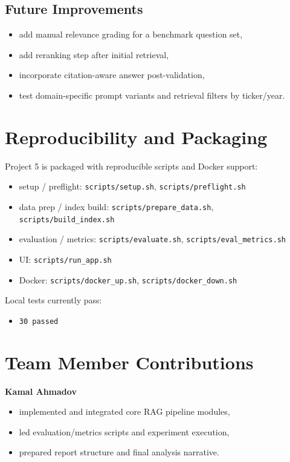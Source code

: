 \documentclass[11pt]{article}
\begin{document}
\subsection{Future Improvements}
\begin{itemize}
    \item add manual relevance grading for a benchmark question set,
    \item add reranking step after initial retrieval,
    \item incorporate citation-aware answer post-validation,
    \item test domain-specific prompt variants and retrieval filters by ticker/year.
\end{itemize}

\section{Reproducibility and Packaging}
Project 5 is packaged with reproducible scripts and Docker support:
\begin{itemize}
    \item setup / preflight: \texttt{scripts/setup.sh}, \texttt{scripts/preflight.sh}
    \item data prep / index build: \texttt{scripts/prepare\_data.sh}, \texttt{scripts/build\_index.sh}
    \item evaluation / metrics: \texttt{scripts/evaluate.sh}, \texttt{scripts/eval\_metrics.sh}
    \item UI: \texttt{scripts/run\_app.sh}
    \item Docker: \texttt{scripts/docker\_up.sh}, \texttt{scripts/docker\_down.sh}
\end{itemize}

Local tests currently pass:
\begin{itemize}
    \item \texttt{30 passed}
\end{itemize}

\section{Team Member Contributions}
\textbf{Kamal Ahmadov}
\begin{itemize}
    \item implemented and integrated core RAG pipeline modules,
    \item led evaluation/metrics scripts and experiment execution,
    \item prepared report structure and final analysis narrative.
\end{itemize}
\end{document}
